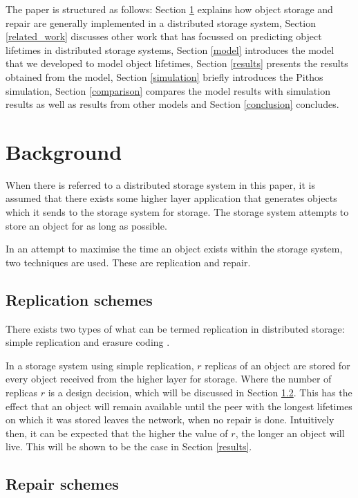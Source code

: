 \documentclass[10pt,a4paper,conference]{IEEEtran}
\begin{document}
The paper is structured as follows: Section \ref{background} explains how object storage and repair are generally implemented in a distributed storage system,
%
Section \ref{related_work} discusses other work that has focussed on predicting object lifetimes in distributed storage systems,
%
Section \ref{model} introduces the model that we developed to model object lifetimes,
%
Section \ref{results} presents the results obtained from the model,
%
Section \ref{simulation} briefly introduces the Pithos simulation,
%
Section \ref{comparison} compares the model results with simulation results as well as results from other models and
%
Section \ref{conclusion} concludes.

\section{Background}
\label{background}

When there is referred to a distributed storage system in this paper, it is assumed that there exists some higher layer application that generates objects which it sends to the storage system for storage. The storage system attempts to store an object for as long as possible.

In an attempt to maximise the time an object exists within the storage system, two techniques are used. These are replication and repair.

\subsection{Replication schemes}

There exists two types of what can be termed replication in distributed storage: simple replication and erasure coding \cite{}.

In a storage system using simple replication, $r$ replicas of an object are stored for every object received from the higher layer for storage. Where the number of replicas $r$ is a design decision, which will be discussed in Section \ref{}. This has the effect that an object will remain available until the peer with the longest lifetimes on which it was stored leaves the network, when no repair is done. Intuitively then, it can be expected that the higher the value of $r$, the longer an object will live. This will be shown to be the case in Section \ref{results}.



\subsection{Repair schemes}
\end{document}
